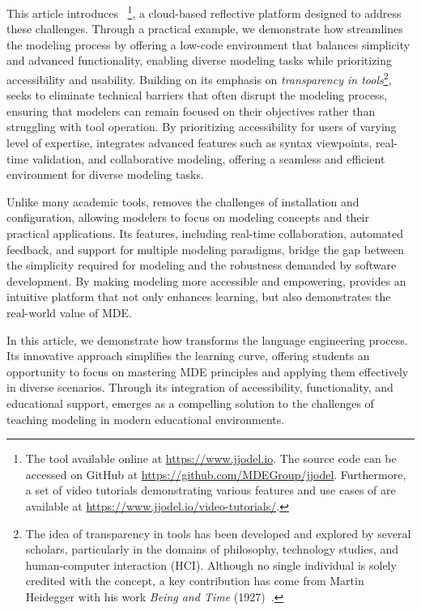 This article introduces \jjodel{}~\cite{di2021enhancing,di2023jjodel}\footnote{The \jjodel{} tool available online at \url{https://www.jjodel.io}. The source code can be accessed on GitHub at \url{https://github.com/MDEGroup/jjodel}. Furthermore, a set of video tutorials demonstrating various features and use cases of \jjodel{} are available at \url{https://www.jjodel.io/video-tutorials/}.}, a cloud-based reflective platform designed to address these challenges. Through a practical example, we demonstrate how \jjodel{} streamlines the modeling process by offering a low-code environment that balances simplicity and advanced functionality, enabling diverse modeling tasks while prioritizing accessibility and usability.  
%
Building on its emphasis on \textit{transparency in tools}\footnote{The idea of transparency in tools has been developed and explored by several scholars, particularly in the domains of philosophy, technology studies, and human-computer interaction (HCI). Although no single individual is solely credited with the concept, a key contribution has come from Martin Heidegger with his work \textit{Being and Time} (1927)~\cite{heidegger1927being}.}, \jjodel{} seeks to eliminate technical barriers that often disrupt the modeling process, ensuring that modelers can remain focused on their objectives rather than struggling with tool operation. By prioritizing accessibility for users of varying level of expertise, \jjodel{} integrates advanced features such as syntax viewpoints, real-time validation, and collaborative modeling, offering a seamless and efficient environment for diverse modeling tasks. 

Unlike many academic tools, \jjodel{} removes the challenges of installation and configuration, allowing modelers to focus on modeling concepts and their practical applications. Its features, including real-time collaboration, automated feedback, and support for multiple modeling paradigms, bridge the gap between the simplicity required for modeling and the robustness demanded by software development. By making modeling more accessible and empowering, \jjodel{} provides an intuitive platform that not only enhances learning, but also demonstrates the real-world value of MDE.

In this article, we demonstrate how \jjodel{} transforms the language engineering process. Its innovative approach simplifies the learning curve, offering students an opportunity to focus on mastering MDE principles and applying them effectively in diverse scenarios. Through its integration of accessibility, functionality, and educational support, \jjodel{} emerges as a compelling solution to the challenges of teaching modeling in modern educational environments. 


